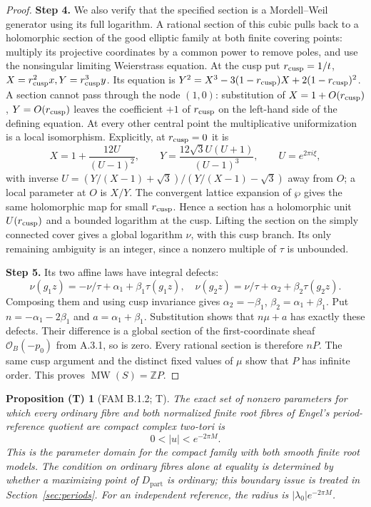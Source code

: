 \documentclass[11pt,a4paper]{article}
\theoremstyle{plain}
\newtheorem{proposition}[theorem]{Proposition (T)}
\theoremstyle{definition}
\newcommand{\partt}{\mathrm{part}}
\begin{document}
\begin{proof}
\par\smallskip\noindent\textbf{Step 4.} We also verify that the specified section is a Mordell--Weil generator using its full logarithm. A rational section of this cubic pulls back to a holomorphic section of the good elliptic family at both finite covering points: multiply its projective coordinates by a common power to remove poles, and use the nonsingular limiting Weierstrass equation. At the cusp put $r_{\rm cusp}=1/t$, $X=r_{\rm cusp}^2x,Y=r_{\rm cusp}^3y$. Its equation is $Y^2=X^3-3(1-r_{\rm cusp})X+2(1-r_{\rm cusp})^2$. A section cannot pass through the node $(1,0)$: substitution of $X=1+O(r_{\rm cusp})$, $Y=O(r_{\rm cusp})$ leaves the coefficient $+1$ of $r_{\rm cusp}$ on the left-hand side of the defining equation. At every other central point the multiplicative uniformization is a local isomorphism. Explicitly, at $r_{\rm cusp}=0$ it is
\[
 X=1+\frac{12U}{(U-1)^2},\qquad
 Y=\frac{12\sqrt3 U(U+1)}{(U-1)^3},\qquad U=e^{2\pi i\xi},
\]
with inverse $U=(Y/(X-1)+\sqrt3)/(Y/(X-1)-\sqrt3)$ away from $O$; a local parameter at $O$ is $X/Y$. The convergent lattice expansion of $\wp$ gives the same holomorphic map for small $r_{\rm cusp}$. Hence a section has a holomorphic unit $U(r_{\rm cusp})$ and a bounded logarithm at the cusp. Lifting the section on the simply connected cover gives a global logarithm $\nu$, with this cusp branch. Its only remaining ambiguity is an integer, since a nonzero multiple of $\tau$ is unbounded.

\par\smallskip\noindent\textbf{Step 5.} Its two affine laws have integral defects:
\[
 \nu(g_1z)=-\nu/\tau+\alpha_1+\beta_1\tau(g_1z),\quad
 \nu(g_2z)=\nu/\tau+\alpha_2+\beta_2\tau(g_2z).
\]
Composing them and using cusp invariance gives $\alpha_2=-\beta_1$, $\beta_2=\alpha_1+\beta_1$. Put $n=-\alpha_1-2\beta_1$ and $a=\alpha_1+\beta_1$. Substitution shows that $n\mu+a$ has exactly these defects. Their difference is a global section of the first-coordinate sheaf $\mathcal O_B(-p_0)$ from A.3.1, so is zero. Every rational section is therefore $nP$. The same cusp argument and the distinct fixed values of $\mu$ show that $P$ has infinite order. This proves $\operatorname{MW}(S)=\mathbb ZP$.
\end{proof}
\begin{proposition}[FAM B.1.2; T]\label{fam:B.1.2}
The exact set of nonzero parameters for which every ordinary fibre and both normalized finite root fibres of Engel's period-reference quotient are compact complex two-tori is
\[
 0<|u|<e^{-2\pi M}.
\]
This is the parameter domain for the compact family with both smooth finite root models. The condition on ordinary fibres alone at equality is determined by whether a maximizing point of $D_{\partt}$ is ordinary; this boundary issue is treated in Section~\ref{sec:periods}. For an independent reference, the radius is $|\lambda_0|e^{-2\pi M}$.
\end{proposition}
\end{document}
